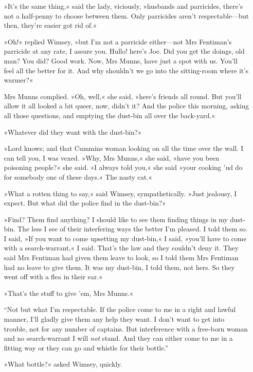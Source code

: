 »It's the same thing,« said the lady, viciously, »husbands and parricides, there's not a half-penny to choose between them. Only parricides aren't respectable\allowbreak---\allowbreak but then, they're easier got rid of.«

»Oh!« replied Wimsey, »but I'm not a parricide either\allowbreak---\allowbreak not Mrs Fentiman's parricide at any rate, I assure you. Hullo! here's Joe. Did you get the doings, old man? You did? Good work. Now, Mrs Munns, have just a spot with us. You'll feel all the better for it. And why shouldn't we go into the sitting-room where it's warmer?«

Mrs Munns complied. »Oh, well,« she said, »here's friends all round. But you'll allow it all looked a bit queer, now, didn't it? And the police this morning, asking all those questions, and emptying the dust-bin all over the back-yard.«

»Whatever did they want with the dust-bin?«

»Lord knows; and that Cummins woman looking on all the time over the wall. I can tell you, I was vexed. »Why, Mrs Munns,« she said, »have you been poisoning people?« she said. »I always told you,« she said »your cooking 'ud do for somebody one of these days.« The nasty cat.«

»What a rotten thing to say,« said Wimsey, sympathetically. »Just jealousy, I expect. But what did the police find in the dust-bin?«

»Find? Them find anything? I should like to see them finding things in my dust-bin. The less I see of their interfering ways the better I'm pleased. I told them so. I said, »If you want to come upsetting my dust-bin,« I said, »you'll have to come with a search-warrant,« I said. That's the law and they couldn't deny it. They said Mrs Fentiman had given them leave to look, so I told them Mrs Fentiman had no leave to give them. It was my dust-bin, I told them, not hers. So they went off with a flea in their ear.«

»That's the stuff to give 'em, Mrs Munns.«

\enquote{Not but what I'm respectable. If the police come to me in a right and lawful manner, I'll gladly give them any help they want. I don't want to get into trouble, not for any number of captains. But interference with a free-born woman and no search-warrant I will \textit{not} stand. And they can either come to me in a fitting way or they can go and whistle for their bottle.}

»What bottle?« asked Wimsey, quickly.

